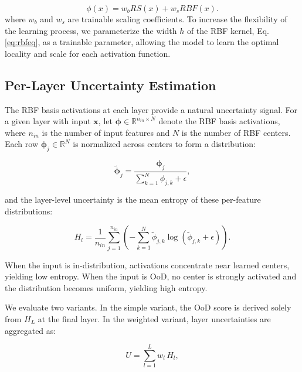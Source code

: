 \documentclass[conference]{IEEEtran}
\begin{document}
\begin{equation} \label{eq:ourkanimplement}
\phi(x) = w_bRS(x) + w_sRBF(x).
\end{equation}
where $w_b$ and $w_s$ are trainable scaling coefficients. To increase the flexibility of the learning process, we parameterize the width $h$ of the RBF kernel, Eq. \ref{eq:rbfeq}, as a trainable parameter, allowing the model to learn the optimal locality and scale for each activation function.


\subsection{Per-Layer Uncertainty Estimation}

The RBF basis activations at each layer provide a natural uncertainty signal. For a given layer with input $\mathbf{x}$, let $\boldsymbol{\phi} \in \mathbb{R}^{n_{in} \times N}$ denote the RBF basis activations, where $n_{in}$ is the number of input features and $N$ is the number of RBF centers. Each row $\boldsymbol{\phi}_j \in \mathbb{R}^N$ is normalized across centers to form a distribution:

\begin{equation} \label{eq:rbfnorm}
\tilde{\boldsymbol{\phi}}_j = \frac{\boldsymbol{\phi}_j}{\sum_{k=1}^{N} \phi_{j,k} + \epsilon},
\end{equation}

and the layer-level uncertainty is the mean entropy of these per-feature distributions:

\begin{equation} \label{eq:layerentropy}
H_l = \frac{1}{n_{in}} \sum_{j=1}^{n_{in}} \left( -\sum_{k=1}^{N} \tilde{\phi}_{j,k} \log\left(\tilde{\phi}_{j,k} + \epsilon\right) \right).
\end{equation}

When the input is in-distribution, activations concentrate near learned centers, yielding low entropy. When the input is OoD, no center is strongly activated and the distribution becomes uniform, yielding high entropy.

We evaluate two variants. In the simple variant, the OoD score is derived solely from $H_L$ at the final layer. In the weighted variant, layer uncertainties are aggregated as:

\begin{equation} \label{eq:weighteduq}
U = \sum_{l=1}^{L} w_l \, H_l,
\end{equation}
\end{document}
